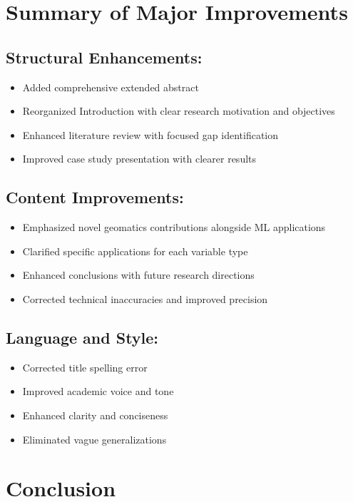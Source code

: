 \documentclass[11pt,a4paper]{article}
\begin{document}
\section{Summary of Major Improvements}

\subsection{Structural Enhancements:}
\begin{itemize}
\item Added comprehensive extended abstract
\item Reorganized Introduction with clear research motivation and objectives
\item Enhanced literature review with focused gap identification
\item Improved case study presentation with clearer results
\end{itemize}

\subsection{Content Improvements:}
\begin{itemize}
\item Emphasized novel geomatics contributions alongside ML applications
\item Clarified specific applications for each variable type
\item Enhanced conclusions with future research directions
\item Corrected technical inaccuracies and improved precision
\end{itemize}

\subsection{Language and Style:}
\begin{itemize}
\item Corrected title spelling error
\item Improved academic voice and tone
\item Enhanced clarity and conciseness
\item Eliminated vague generalizations
\end{itemize}

\section{Conclusion}
\end{document}
